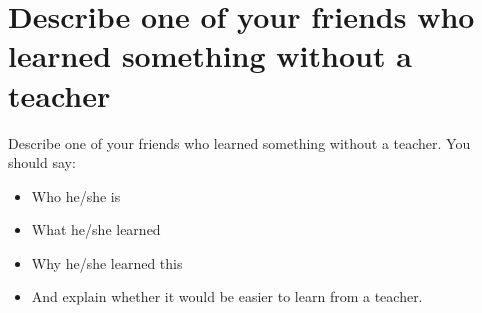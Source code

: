 \section{Describe one of your friends who learned something without a teacher}
\begin{ieltsprompt}
Describe one of your friends who learned something without a teacher.
You should say:
\begin{itemize}[leftmargin=2em, itemsep=2pt]
\item Who he/she is
\item What he/she learned
\item Why he/she learned this
\item And explain whether it would be easier to learn from a teacher.
\end{itemize}
\end{ieltsprompt}
